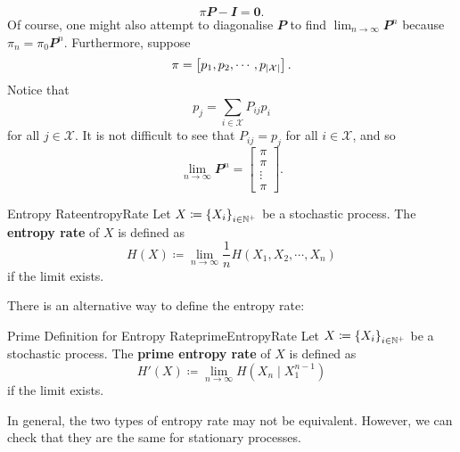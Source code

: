 \documentclass[math]{amznotes}
\theoremstyle{remark}
\begin{document}
\begin{equation*}
    \pi\mathbfit{P - I} = \mathbf{0}.
\end{equation*}
Of course, one might also attempt to diagonalise $\mathbfit{P}$ to find $\lim_{n \to \infty}\mathbfit{P}^n$ because $\pi_n = \pi_0\mathbfit{P}^n$. Furthermore, suppose 
\begin{equation*}
    \pi = \begin{bmatrix}
        p_1, p_2, \cdots, p_{{\left\lvert {\mathcal{X}} \right\rvert}}
    \end{bmatrix}.
\end{equation*}
Notice that
\begin{equation*}
    p_j = \sum_{i \in \mathcal{X}}P_{ij}p_i
\end{equation*}
for all $j \in \mathcal{X}$. It is not difficult to see that $P_{ij} = p_j$ for all $i \in \mathcal{X}$, and so 
\begin{equation*}
    \lim_{n \to \infty}\mathbfit{P}^n = \begin{bmatrix}
        \pi \\
        \pi \\
        \vdots \\
        \pi
    \end{bmatrix}.
\end{equation*}
\begin{dfnbox}{Entropy Rate}{entropyRate}
    Let $X \coloneqq \left\{X_i\right\}_{i \in \mathbb{N}^+}$ be a stochastic process. The {\color{red} \textbf{entropy rate}} of $X$ is defined as 
    \begin{equation*}
        H\left(X\right) \coloneqq \lim_{n \to \infty}\frac{1}{n}H\left(X_1, X_2, \cdots, X_n\right)
    \end{equation*}
    if the limit exists.
\end{dfnbox}
There is an alternative way to define the entropy rate:
\begin{dfnbox}{Prime Definition for Entropy Rate}{primeEntropyRate}
    Let $X \coloneqq \left\{X_i\right\}_{i \in \mathbb{N}^+}$ be a stochastic process. The {\color{red} \textbf{prime entropy rate}} of $X$ is defined as 
    \begin{equation*}
        H'\left(X\right) \coloneqq \lim_{n \to \infty}H\left(X_{n} \mid X_1^{n - 1}\right)
    \end{equation*}
    if the limit exists.
\end{dfnbox}
In general, the two types of entropy rate may not be equivalent. However, we can check that they are the same for stationary processes.
\end{document}
